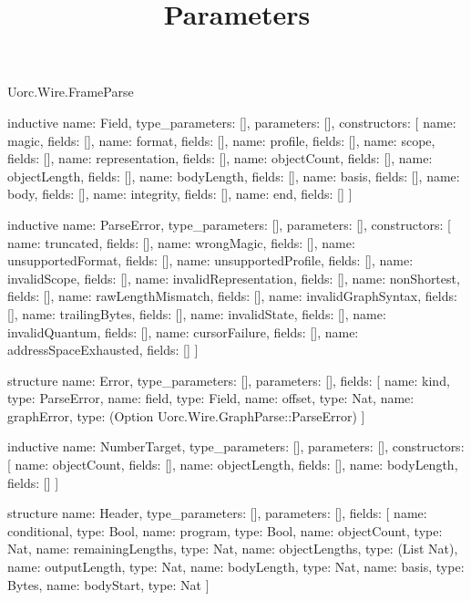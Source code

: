 \begin{lexlean}{Uorc.Wire.FrameParse}
\title{Parameters}
\begin{semanticmodule}
inductive{
  name: Field,
  type_parameters: [],
  parameters: [],
  constructors: [
    {name: magic, fields: []},
    {name: format, fields: []},
    {name: profile, fields: []},
    {name: scope, fields: []},
    {name: representation, fields: []},
    {name: objectCount, fields: []},
    {name: objectLength, fields: []},
    {name: bodyLength, fields: []},
    {name: basis, fields: []},
    {name: body, fields: []},
    {name: integrity, fields: []},
    {name: end, fields: []}
  ]
}

inductive{
  name: ParseError,
  type_parameters: [],
  parameters: [],
  constructors: [
    {name: truncated, fields: []},
    {name: wrongMagic, fields: []},
    {name: unsupportedFormat, fields: []},
    {name: unsupportedProfile, fields: []},
    {name: invalidScope, fields: []},
    {name: invalidRepresentation, fields: []},
    {name: nonShortest, fields: []},
    {name: rawLengthMismatch, fields: []},
    {name: invalidGraphSyntax, fields: []},
    {name: trailingBytes, fields: []},
    {name: invalidState, fields: []},
    {name: invalidQuantum, fields: []},
    {name: cursorFailure, fields: []},
    {name: addressSpaceExhausted, fields: []}
  ]
}

structure{
  name: Error,
  type_parameters: [],
  parameters: [],
  fields: [
    {name: kind, type: ParseError},
    {name: field, type: Field},
    {name: offset, type: Nat},
    {name: graphError, type: (Option Uorc.Wire.GraphParse::ParseError)}
  ]
}

inductive{
  name: NumberTarget,
  type_parameters: [],
  parameters: [],
  constructors: [
    {name: objectCount, fields: []},
    {name: objectLength, fields: []},
    {name: bodyLength, fields: []}
  ]
}

structure{
  name: Header,
  type_parameters: [],
  parameters: [],
  fields: [
    {name: conditional, type: Bool},
    {name: program, type: Bool},
    {name: objectCount, type: Nat},
    {name: remainingLengths, type: Nat},
    {name: objectLengths, type: (List Nat)},
    {name: outputLength, type: Nat},
    {name: bodyLength, type: Nat},
    {name: basis, type: Bytes},
    {name: bodyStart, type: Nat}
  ]
}


\end{semanticmodule}
\end{lexlean}

